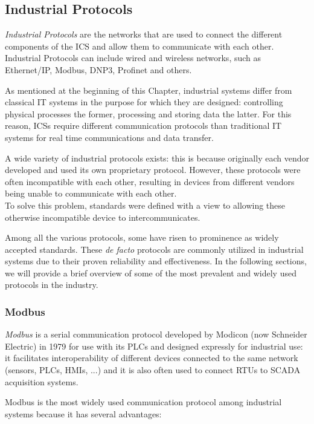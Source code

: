 \subsection{Industrial Protocols}
\label{subsec:2_ot_communication_networks}
\textit{Industrial Protocols} are the networks that are used to connect the different components of the ICS and allow them to communicate with each other. Industrial Protocols can include wired and wireless networks, such as Ethernet/IP, Modbus, DNP3, Profinet and others.

As mentioned at the beginning of this Chapter, industrial systems differ from classical IT systems in the purpose for which they are designed: controlling physical processes the former, processing and storing data the latter. For this reason, ICSs require different communication protocols than traditional IT systems for real time communications and data transfer.

\bigskip
A wide variety of industrial protocols exists: this is because originally each vendor developed and used its own proprietary protocol. However, these protocols were often incompatible with each other, resulting in devices from different vendors being unable to communicate with each other.
\\To solve this problem, standards were defined with a view to allowing these otherwise incompatible device to intercommunicates.

Among all the various protocols, some have risen to prominence as widely accepted standards. These \textit{de facto} protocols are commonly utilized in industrial systems due to their proven reliability and effectiveness. In the following sections, we will provide a brief overview of some of the most prevalent and widely used protocols in the industry.
\vfill

\subsubsection{Modbus}
\label{subsubsec:2_modbus}
\textit{Modbus} is a serial communication protocol developed by Modicon (now Schneider Electric) in 1979 for use with its PLCs \cite{Modbus_definition} and designed expressly for industrial use: it facilitates interoperability of different devices connected to the same network (sensors, PLCs, HMIs, ...) and it is also often used to connect RTUs to SCADA acquisition systems.

\bigskip
Modbus is the most widely used communication protocol among industrial systems because it has several advantages:

